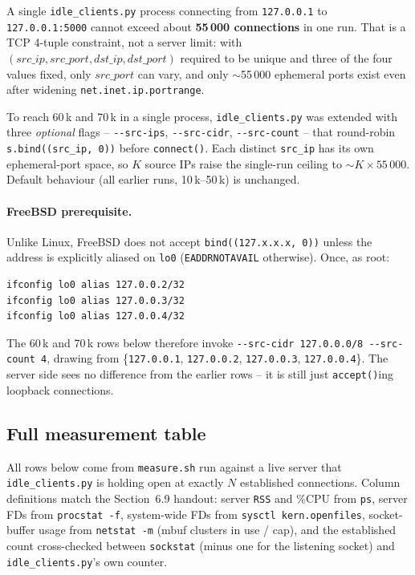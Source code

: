 \documentclass[11pt,a4paper]{article}
\begin{document}
A single \texttt{idle\_clients.py} process connecting from \texttt{127.0.0.1} to
\texttt{127.0.0.1:5000} cannot exceed about \textbf{55\,000 connections} in one run.
That is a TCP 4-tuple constraint, not a server limit: with $(src\_ip, src\_port,
dst\_ip, dst\_port)$ required to be unique and three of the four values fixed, only
$src\_port$ can vary, and only $\sim$55\,000 ephemeral ports exist even after widening
\texttt{net.inet.ip.portrange}.

To reach 60\,k and 70\,k in a single process, \texttt{idle\_clients.py} was extended
with three \emph{optional} flags -- \texttt{-{}-src-ips}, \texttt{-{}-src-cidr},
\texttt{-{}-src-count} -- that round-robin \texttt{s.bind((src\_ip, 0))} before
\texttt{connect()}.  Each distinct \texttt{src\_ip} has its own ephemeral-port space, so
$K$ source IPs raise the single-run ceiling to $\sim K \times 55\,000$.  Default
behaviour (all earlier runs, 10\,k--50\,k) is unchanged.

\paragraph{FreeBSD prerequisite.}  Unlike Linux, FreeBSD does not accept
\texttt{bind((127.x.x.x, 0))} unless the address is explicitly aliased on \texttt{lo0}
(\texttt{EADDRNOTAVAIL} otherwise).  Once, as root:

\begin{lstlisting}
ifconfig lo0 alias 127.0.0.2/32
ifconfig lo0 alias 127.0.0.3/32
ifconfig lo0 alias 127.0.0.4/32
\end{lstlisting}

The 60\,k and 70\,k rows below therefore invoke
\texttt{-{}-src-cidr 127.0.0.0/8 -{}-src-count 4}, drawing from
\{\texttt{127.0.0.1}, \texttt{127.0.0.2}, \texttt{127.0.0.3}, \texttt{127.0.0.4}\}.
The server side sees no difference from the earlier rows -- it is still just
\texttt{accept()}ing loopback connections.

\subsection{Full measurement table}
\label{sec:bonus-table}

All rows below come from \texttt{measure.sh} run against a live server that
\texttt{idle\_clients.py} is holding open at exactly $N$ established connections.
Column definitions match the Section~6.9 handout: server \texttt{RSS} and \%CPU from
\texttt{ps}, server FDs from \texttt{procstat -f}, system-wide FDs from
\texttt{sysctl kern.openfiles}, socket-buffer usage from \texttt{netstat -m} (mbuf
clusters in use / cap), and the established count cross-checked between
\texttt{sockstat} (minus one for the listening socket) and \texttt{idle\_clients.py}'s
own counter.
\end{document}
